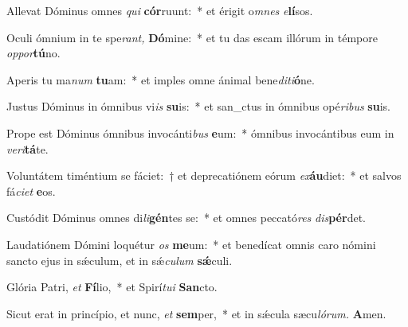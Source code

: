 \item Allevat Dóminus omnes \textit{qui} \textbf{cór}ruunt:~* et érigit o\textit{mnes} \textit{e}\textbf{lí}sos.
\item Oculi ó\-mnium in te spe\textit{rant,} \textbf{Dó}mine:~* et tu das escam illórum in témpore \textit{oppor}\textbf{tú}no.
\item Aperis tu ma\textit{num} \textbf{tu}am:~* et imples omne ánimal bene\textit{diti}\textbf{ó}ne.
\item Justus Dóminus in ómnibus vi\textit{is} \textbf{su}is:~* et san\_ctus in ó\-mnibus opé\textit{ribus} \textbf{su}is.
\item Prope est Dóminus ómnibus invocánti\textit{bus} \textbf{e}um:~* ó\-mnibus invocántibus eum in \textit{veri}\textbf{tá}te.
\item Voluntátem timéntium se fáciet:~† et deprecatiónem eórum \textit{ex}\textbf{áu}diet:~* et salvos fá\textit{ciet} \textbf{e}os.
\item Custódit Dóminus omnes di\textit{li}\textbf{gén}tes se:~* et o\-mnes peccató\textit{res} \textit{dis}\textbf{pér}det.
\item Laudatiónem Dómini loquétur \textit{os} \textbf{me}um:~* et benedícat o\-mnis caro nómini sancto ejus in sǽculum, et in sǽ\hspace*{0.02em}\textit{cu}\textit{lum} \textbf{sǽ}culi.
\item Glória Patri, \textit{et} \textbf{Fí}lio,~* et Spirí\tinyhspace\textit{tui} \textbf{San}cto.
\item Sicut erat in princípio, et nunc, \textit{et} \textbf{sem}per,~* et in sǽcula sæcu\tinyhspace\textit{lórum.} \textbf{A}men.